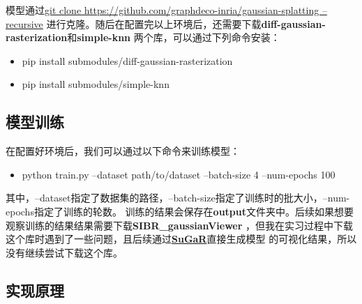 \documentclass{nwputhesis}
\begin{document}
\indent
模型通过\underline{git clone https://github.com/graphdeco-inria/gaussian-splatting --recursive}
进行克隆。随后在配置完以上环境后，还需要下载\textbf{diff-gaussian-rasterization}和\textbf{simple-knn}
两个库，可以通过下列命令安装：
\begin{itemize}
    \item pip install submodules/diff-gaussian-rasterization
    \item pip install submodules/simple-knn
\end{itemize}
\subsection{模型训练}
\indent
在配置好环境后，我们可以通过以下命令来训练模型：
\begin{itemize}
    \item python train.py --dataset path/to/dataset --batch-size 4 --num-epochs 100
\end{itemize}

\indent
其中，--dataset指定了数据集的路径，--batch-size指定了训练时的批大小，--num-epochs指定了训练的轮数。
训练的结果会保存在\textbf{output}文件夹中。后续如果想要观察训练的结果结果需要下载\textbf{SIBR\_gaussianViewer}
，但我在实习过程中下载这个库时遇到了一些问题，且后续通过\textbf{\hyperlink{sugar}{SuGaR}}直接生成模型
的可视化结果，所以没有继续尝试下载这个库。\\

\subsection{实现原理}
\end{document}
